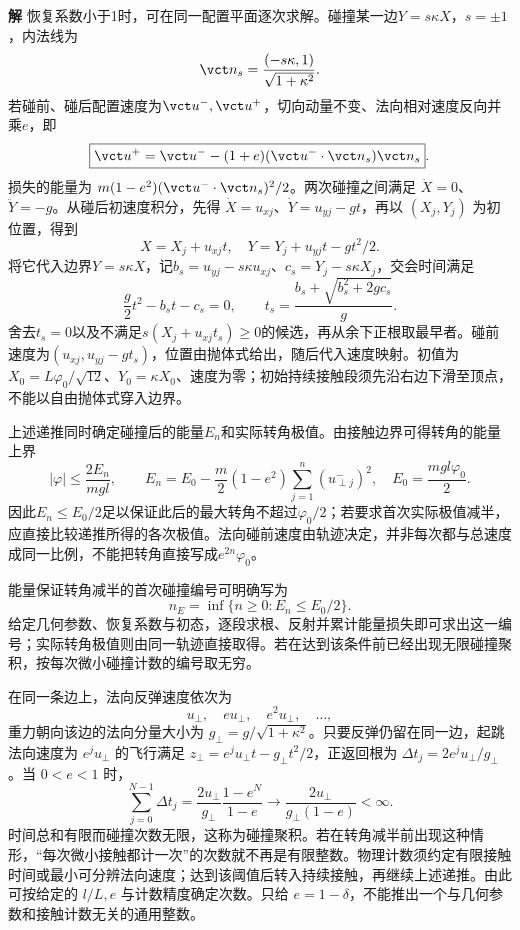 \documentclass[11pt,openany,fontset=fandol]{ctexbook}
\theoremstyle{definition}\newtheorem{example}{例}[chapter]\newtheorem{exercise}{习题}[chapter]
\newcommand{\SolutionStart}{\par\medskip\ifdim\pagetotal>0pt\ifdim\dimexpr\pagegoal-\pagetotal\relax<3\baselineskip\newpage\fi\fi\noindent\textbf{解}\quad\ignorespaces}
\newenvironment{solution}{\SolutionStart}{\par\medskip}
\begin{document}
\begin{solution}
恢复系数小于1时，可在同一配置平面逐次求解。碰撞某一边$Y=s\kappa X$，$s=\pm1$，内法线为
\[
 \vct n_s=\frac{(-s\kappa,1)}{\sqrt{1+\kappa^2}}.
\]
若碰前、碰后配置速度为$\vct u^-,\vct u^+$，切向动量不变、法向相对速度反向并乘$e$，即
\[
 \boxed{\vct u^+=\vct u^--(1+e)(\vct u^-\cdot\vct n_s)\vct n_s}.
\]
损失的能量为 $m(1-e^2)(\vct u^-\cdot\vct n_s)^2/2$。两次碰撞之间满足 $\ddot X=0$、$\ddot Y=-g$。从碰后初速度积分，先得 $\dot X=u_{xj}$、$\dot Y=u_{yj}-gt$，再以 $(X_j,Y_j)$ 为初位置，得到
\[
 X=X_j+u_{xj}t,\quad
 Y=Y_j+u_{yj}t-gt^2/2.
\]
将它代入边界$Y=s\kappa X$，记$b_s=u_{yj}-s\kappa u_{xj}$、$c_s=Y_j-s\kappa X_j$，交会时间满足
\[
\frac g2t^2-b_st-c_s=0,
\qquad t_s=\frac{b_s+\sqrt{b_s^2+2gc_s}}g.
\]
舍去$t_s=0$以及不满足$s(X_j+u_{xj}t_s)\ge0$的候选，再从余下正根取最早者。碰前速度为$(u_{xj},u_{yj}-gt_s)$，位置由抛体式给出，随后代入速度映射。初值为$X_0=L\varphi_0/\sqrt{12}$、$Y_0=\kappa X_0$、速度为零；初始持续接触段须先沿右边下滑至顶点，不能以自由抛体式穿入边界。

上述递推同时确定碰撞后的能量$E_n$和实际转角极值。由接触边界可得转角的能量上界
\[
 |\varphi|\le\frac{2E_n}{mgl},\qquad
 E_n=E_0-\frac m2(1-e^2)\sum_{j=1}^n (u_{\perp j}^-)^2,
 \quad E_0=\frac{mgl\varphi_0}{2}.
\]
因此$E_n\le E_0/2$足以保证此后的最大转角不超过$\varphi_0/2$；若要求首次实际极值减半，应直接比较递推所得的各次极值。法向碰前速度由轨迹决定，并非每次都与总速度成同一比例，不能把转角直接写成$e^{2n}\varphi_0$。

能量保证转角减半的首次碰撞编号可明确写为
\[
 n_E=\inf\{n\ge0:E_n\le E_0/2\}.
\]
给定几何参数、恢复系数与初态，逐段求根、反射并累计能量损失即可求出这一编号；实际转角极值则由同一轨迹直接取得。若在达到该条件前已经出现无限碰撞聚积，按每次微小碰撞计数的编号取无穷。

在同一条边上，法向反弹速度依次为
\[
 u_\perp,\quad e u_\perp,\quad e^2u_\perp,\quad\ldots,
\]
重力朝向该边的法向分量大小为 $g_\perp=g/\sqrt{1+\kappa^2}$。只要反弹仍留在同一边，起跳法向速度为 $e^ju_\perp$ 的飞行满足 $z_\perp=e^ju_\perp t-g_\perp t^2/2$，正返回根为 $\Delta t_j=2e^ju_\perp/g_\perp$。当 $0<e<1$ 时，
\[
\sum_{j=0}^{N-1}\Delta t_j
=\frac{2u_\perp}{g_\perp}\frac{1-e^N}{1-e}
\longrightarrow\frac{2u_\perp}{g_\perp(1-e)}<\infty.
\]
时间总和有限而碰撞次数无限，这称为碰撞聚积。若在转角减半前出现这种情形，“每次微小接触都计一次”的次数就不再是有限整数。物理计数须约定有限接触时间或最小可分辨法向速度；达到该阈值后转入持续接触，再继续上述递推。由此可按给定的 $l/L,e$ 与计数精度确定次数。只给 $e=1-\delta$，不能推出一个与几何参数和接触计数无关的通用整数。


\begin{figure}[H]\centering
\begin{tikzpicture}[>=Stealth,line cap=round,line join=round]


\end{tikzpicture}
\end{figure}
\end{solution}
\end{document}
